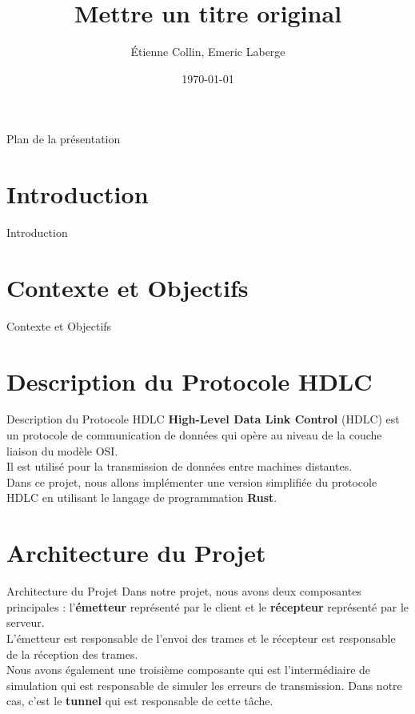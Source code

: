 \documentclass{beamer}
\title{Mettre un titre original}
\author{Étienne Collin, Emeric Laberge}
\date{\today}
\begin{document}
\maketitle

\begin{frame}{Plan de la présentation}
	\tableofcontents
\end{frame}
\section{Introduction}
\begin{frame}{Introduction}

\end{frame}

\section{Contexte et Objectifs}
\begin{frame}{Contexte et Objectifs}

\end{frame}

\section{Description du Protocole HDLC}
\begin{frame}{Description du Protocole HDLC}
  \textbf{High-Level Data Link Control} (HDLC) est un protocole de communication
  de données qui opère au niveau de la couche liaison du modèle OSI.\\ 
  Il est utilisé pour la transmission de données entre machines distantes.\\ 
  Dans ce projet, nous allons implémenter une version simplifiée du protocole
  HDLC en utilisant le langage de programmation \textbf{Rust}. 
\end{frame}

\section{Architecture du Projet}
\begin{frame}{Architecture du Projet} 
  Dans notre projet, nous avons deux composantes principales : l'\textbf{émetteur}
  représenté par le client  et le \textbf{récepteur} représenté
  par le serveur.\\
  L'émetteur est responsable de l'envoi des trames et le récepteur est
  responsable de la réception des trames.\\ 
  Nous avons également une troisième composante qui est l'intermédiaire de
  simulation qui est responsable de simuler les erreurs de transmission. Dans
  notre cas, c'est le \textbf{tunnel} qui est responsable de cette tâche. 
\end{frame}
\end{document}
